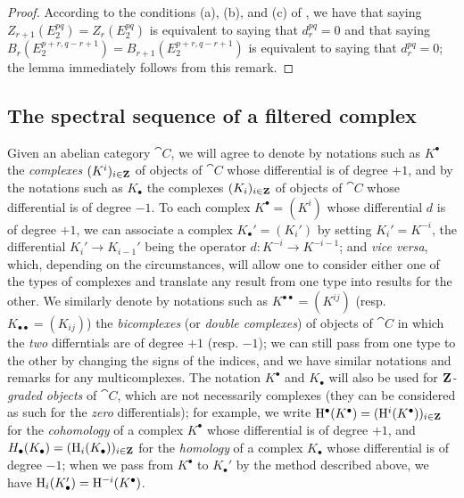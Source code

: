 \begin{proof}
\label{proof-0.11.1.10}
According to the conditions (a), (b), and (c) of , we have that saying $Z_{r+1}(E_2^{pq})=Z_r(E_2^{pq})$ is equivalent to saying that $d_r^{pq}=0$ and that saying $B_r(E_2^{p+r,q-r+1})=B_{r+1}(E_2^{p+r,q-r+1})$ is equivalent to saying that $d_r^{pq}=0$; the lemma immediately follows from this remark.
\end{proof}

\subsection{The spectral sequence of a filtered complex}
\label{subsection:0.11.2}

\begin{env}[11.2.1]
\label{0.11.2.1}
Given an abelian category $\cat{C}$, we will agree to denote by notations such as $K^\bullet$ the \emph{complexes $(K^i)_{i\in\mathbf{Z}}$} of objects of $\cat{C}$ whose differential is of degree $+1$, and by the notations such as $K_\bullet$ the complexes $(K_i)_{i\in\mathbf{Z}}$ of objects of $\cat{C}$ whose differential is of degree $-1$.
To each complex $K^\bullet=(K^i)$ whose differential $d$ is of degree $+1$, we can associate a complex $K_\bullet'=(K_i')$ by setting $K_i'=K^{-i}$, the differential $K_i'\to K_{i-1}'$ being the operator $d:K^{-i}\to K^{-i-1}$; and \emph{vice versa}, which, depending on the circumstances, will allow one to consider either one of the types of complexes and translate  any result from one type into results for the other.
We similarly denote by notations such as $K^{\bullet\bullet}=(K^{ij})$ (resp. $K_{\bullet\bullet}=(K_{ij})$) the \emph{bicomplexes} (or \emph{double complexes}) of objects of $\cat{C}$ in which the \emph{two} differntials are of degree $+1$ (resp. $-1$); we can still pass from one type to the other by changing the signs of the indices, and we have similar notations and remarks for any multicomplexes.
The notation $K^\bullet$ and $K_\bullet$ will also be used for \emph{$\mathbf{Z}$-graded objects} of $\cat{C}$, which are not necessarily complexes (they can be considered as such for the \emph{zero} differentials); for example, we write $\mathrm{H}^\bullet(K^\bullet)=(\mathrm{H}^i(K^\bullet))_{i\in\mathbf{Z}}$ for the \emph{cohomology} of a complex $K^\bullet$ whose differential is of degree $+1$, and $H_\bullet(K_\bullet)=(\mathrm{H}_i(K_\bullet))_{i\in\mathbf{Z}}$ for the \emph{homology} of a complex $K_\bullet$ whose differential is of degree $-1$; when we pass from $K^\bullet$ to $K_\bullet'$ by the method described above, we have $\mathrm{H}_i(K_\bullet')=\mathrm{H}^{-i}(K^\bullet)$.


\end{env}
